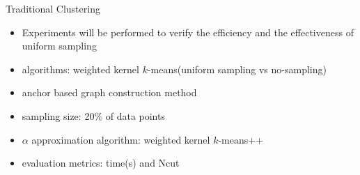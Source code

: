 \documentclass{beamer}
\begin{document}
\begin{frame}{Traditional Clustering}
	\begin{center}
	\end{center}
	\begin{itemize}
		\scriptsize
		\item Experiments will be performed to verify the efficiency and the effectiveness of uniform sampling
		\item algorithms: weighted kernel $k$-means(uniform sampling vs no-sampling)
		\item anchor based graph construction method
		\item sampling size: 20\% of data points
		\item $\alpha$ approximation algorithm: weighted kernel $k$-means++
		\item evaluation metrics: time(s) and Ncut
	\end{itemize}
\end{frame}
\end{document}

